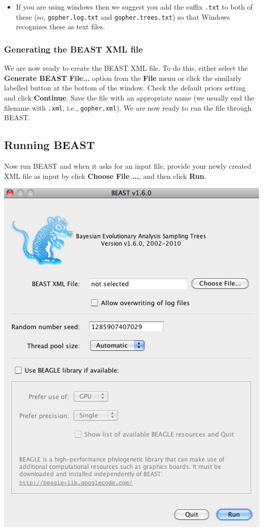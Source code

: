 \documentclass[12pt]{article}
\begin{document}
\medskip{}

\begin{itemize}
\item If you are using windows then we suggest you add the suffix \texttt{.txt} to both of these (so,
\texttt{gopher.log.txt} and \texttt{gopher.trees.txt}) so that Windows recognizes
these as text files. 
\end{itemize}

\subsubsection*{Generating the BEAST XML file }

We are now ready to create the BEAST XML file. To do this,
either select the {\bf Generate BEAST File...} option from the \textbf{File} menu or click the similarly labelled button at the bottom of the window. Check the default priors setting and click \textbf{Continue}. Save the file with an appropriate name
(we usually end the filename with \texttt{.xml}, i.e., \texttt{gopher.xml}).
We are now ready to run the file through BEAST. 

\subsection*{Running BEAST }

Now run BEAST and when it asks for an input file, provide your newly
created XML file as input by click \textbf{Choose File ...}, and then click \textbf{Run}. 

\medskip{}

\includegraphics[scale=0.5]{figures/BEAST}
\end{document}
